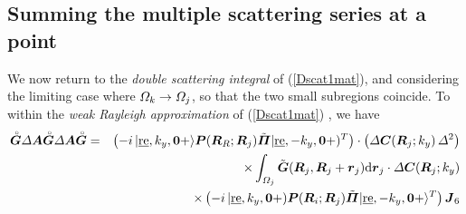 \subsection{Summing the multiple scattering series at a point}

We now return to the {\em double scattering integral\/} of (\ref{Dscat1mat}), 
and considering the limiting case where ${\mit 
\Omega}_k\rightarrow{\mit \Omega}_j$, so that the two small subregions 
coincide.  To within the {\em weak 
Rayleigh approximation\/} of (\ref{Dscat1mat}) , we have 
\begin{eqnarray} \label{Dscat2mat}
{\rf{\bmi G}}{\mit \Delta} {\bmi A} {\rf{\bmi G}}
{\mit \Delta} {\bmi A}{\rf{\bmi G}}&=&
\left(-i\,|\re,k_y,{\bf 0}+\rangle {\bmi  P}({\bmi  R}_{R};{\bmi  R}_{j})
	\tilde{\bmi \Pi}|\re,-k_y,{\bf 0}+)^{T}\right)\cdot\left({\mit \Delta}{\bmi 
	C}({\bmi R}_j;k_y)\,{\mit \Delta}^2  \right)
\nonumber\\
&&\times
\int_{{\mit \Omega }_{j}}{\tilde{\bmi  
G}}({\bmi 
R}_j,{\bmi  R}_j+{\bmi  r}_j){\rm d}{\bmi r}_j \cdot{\mit \Delta}{\bmi 
	C}({\bmi R}_j;k_y)\nonumber\\
&&\times
\left( -i\,|\re,k_y,{\bf 0}+) {\bmi  P}({\bmi  R}_{i};{\bmi  R}_{j})
	\tilde{\bmi \Pi}|\re,-k_y,{\bf 0}+\rangle^{T}\right){\bmi J}_{6}
\end{eqnarray}

